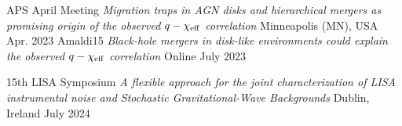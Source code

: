 

\begin{cventries}

\cventry
{APS April Meeting}
{\emph{Migration traps in AGN disks and hierarchical mergers as promising origin of the observed $q-\chi_{\rm eff}$ correlation}}
{Minneapolis (MN), USA}
{Apr. 2023}
{}
\cventry
{Amaldi15}
{\emph{Black-hole mergers in disk-like environments could explain the observed $q-\chi_{\rm eff}$ correlation}}
{Online}
{July 2023}
{}
\end{cventries}


\begin{cventries}

\cventry
{15th LISA Symposium}
{\emph{A flexible approach for the joint characterization of LISA instrumental noise and Stochastic Gravitational-Wave Backgrounds}}
{Dublin, Ireland}
{July 2024}
{}
%
\end{cventries}
%
%
%
%
